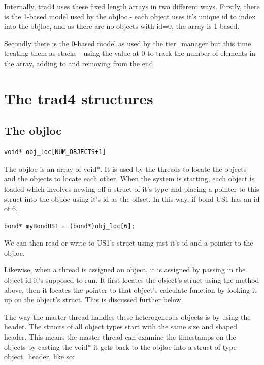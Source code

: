 \documentclass{report}
\begin{document}
Internally, trad4 uses these fixed length arrays in two different ways.  Firstly, there is the 1-based model used by the objloc - each object uses it's unique id to index into the objloc, and as there are no objects with id=0, the array is 1-based.

Secondly there is the 0-based model as used by the tier_manager but this time treating them as stacks - using the value at 0 to track the number of elements in the array, adding to and removing from the end.

\section{The trad4 structures}

\subsection{The objloc}

\begin{verbatim}
void* obj_loc[NUM_OBJECTS+1]
\end{verbatim}

The objloc is an array of void*. It is used by the threads to locate the objects and the objects to locate each other. When the system is starting, each object is loaded which involves newing off a struct of it's type and placing a pointer to this struct into the objloc using it's id as the offset.  In this way, if bond US1 has an id of 6,

\begin{verbatim}
bond* myBondUS1 = (bond*)obj_loc[6];
\end{verbatim}

We can then read or write to US1's struct using just it's id and a pointer to the objloc.

Likewise, when a thread is assigned an object, it is assigned by passing in the object id it's supposed to run. It first locates the object's struct using the method above, then it locates the pointer to that object's 
calculate function by looking it up on the object's struct. This is discussed further below.

The way the master thread handles these heterogeneous objects is by using the header. The structs of all object types start with the same size and shaped header. This means the master thread can examine the timestamps on the objects by casting the void* it gets back to the objloc into a struct of type object_header, like so:
\end{document}
